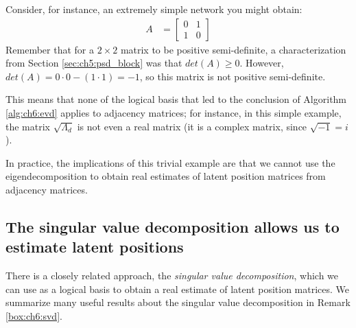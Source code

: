 Consider, for instance, an extremely simple network you might obtain:
\begin{align*}
    A &= \begin{bmatrix}
        0 & 1 \\
        1 & 0
    \end{bmatrix}
\end{align*}
Remember that for a $2 \times 2$ matrix to be positive semi-definite, a characterization from Section \ref{sec:ch5:psd_block} was that $det(A) \geq 0$. However, $det(A) = 0 \cdot 0 - (1 \cdot 1) = -1$, so this matrix is not positive semi-definite. 

This means that none of the logical basis that led to the conclusion of Algorithm \ref{alg:ch6:evd} applies to adjacency matrices; for instance, in this simple example, the matrix $\sqrt{\Lambda_d}$ is not even a real matrix (it is a complex matrix, since $\sqrt{-1} = i$). 

In practice, the implications of this trivial example are that we cannot use the eigendecomposition to obtain real estimates of latent position matrices from adjacency matrices.

\subsection{The singular value decomposition allows us to estimate latent positions}

There is a closely related approach, the \textit{singular value decomposition}, which we can use as a logical basis to obtain a real estimate of latent position matrices. We summarize many useful results about the singular value decomposition in Remark \ref{box:ch6:svd}.


